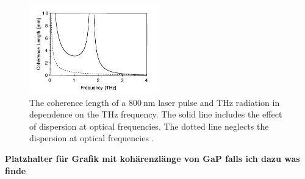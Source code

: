 \begin{figure}
    \centering
    \includegraphics[width=0.5\textwidth]{refferenced_pic/coherence_length_ZnTe.png}
    \caption{The coherence length of a $\SI{800}{\nano\meter}$ laser pulse and $\si{\tera\hertz}$ radiation in dependence on the $\si{\tera\hertz}$ frequency.
    The solid line includes the effect of dispersion at optical frequencies. The dotted line neglects the dispersion at optical frequencies \cite{coherence_legnth}.}
    \label{fig:coherence_legnth}
\end{figure}
\textbf{Platzhalter für Grafik mit kohärenzlänge von GaP falls ich dazu was finde}
\FloatBarrier

